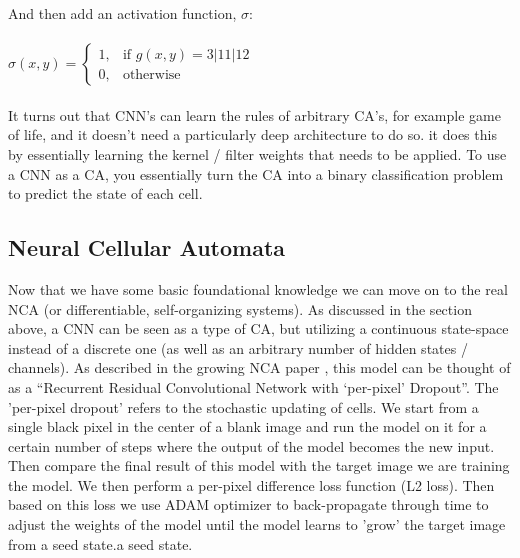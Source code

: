 And then add an activation function, $\sigma$: \\ \\

$
\sigma(x, y) = \begin{cases}
	1, & \text{if } g(x, y) = 3 | 11 | 12 \\
	0, & \text{otherwise}
\end{cases}
$
\\ \\


It turns out that CNN's can learn the rules of arbitrary CA's, for example game of life, and it doesn't need a particularly deep architecture to do so. it does this by essentially learning the kernel / filter weights that needs to be applied. To use a CNN as a CA, you essentially turn the CA into a binary classification problem to predict the state of each cell.

\subsection{Neural Cellular Automata}

Now that we have some basic foundational knowledge we can move on to the real NCA (or differentiable, self-organizing systems). As discussed in the section above, a CNN can be seen as a type of CA, but utilizing a continuous state-space instead of a discrete one (as well as an arbitrary number of hidden states / channels). As described in the growing NCA paper , this model can be thought of as a “Recurrent Residual Convolutional Network with ‘per-pixel’ Dropout”. The 'per-pixel dropout' refers to the stochastic updating of cells. We start from a single black pixel in the center of a blank image and run the model on it for a certain number of steps where the output of the model becomes the new input. Then compare the final result of this model with the target image we are training the model. We then perform a per-pixel difference loss function (L2 loss). Then based on this loss we use ADAM optimizer to back-propagate through time to adjust the weights of the model until the model learns to 'grow' the target image from a seed state.a seed state.
